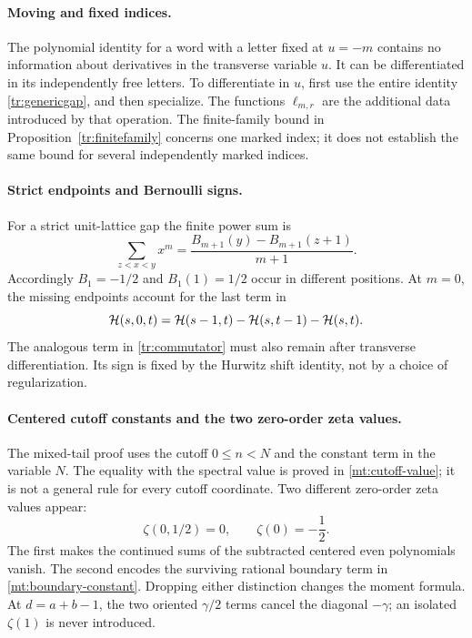 \paragraph{Moving and fixed indices.}
The polynomial identity for a word with a letter fixed at $u=-m$
contains no information about derivatives in the transverse variable
$u$.  It can be differentiated in its independently free letters.
To differentiate in $u$, first use the entire identity
\eqref{tr:genericgap}, and then specialize.  The functions
$\ell_{m,r}$ are the additional data introduced by that operation.
The finite-family bound in Proposition~\ref{tr:finitefamily} concerns
one marked index; it does not establish the same bound for several
independently marked indices.

\paragraph{Strict endpoints and Bernoulli signs.}
For a strict unit-lattice gap the finite power sum is
\[
 \sum_{z<x<y}x^m
   =\frac{B_{m+1}(y)-B_{m+1}(z+1)}{m+1}.
\]
Accordingly $B_1=-1/2$ and $B_1(1)=1/2$ occur in different positions.
At $m=0$, the missing endpoints account for the last term in
\[
 \mathcal H(s,0,t)=\mathcal H(s-1,t)-\mathcal H(s,t-1)-\mathcal H(s,t).
\]
The analogous term in \eqref{tr:commutator} must also remain after
transverse differentiation.  Its sign is fixed by the Hurwitz shift
identity, not by a choice of regularization.

\paragraph{Centered cutoff constants and the two zero-order zeta values.}
The mixed-tail proof uses the cutoff $0\leq n<N$ and the constant
term in the variable $N$.  The equality with the spectral value is
proved in \eqref{mt:cutoff-value}; it is not a general rule for every
cutoff coordinate.  Two different zero-order zeta values appear:
\[
                \zeta(0,1/2)=0,\qquad \zeta(0)=-\frac12.
\]
The first makes the continued sums of the subtracted centered even
polynomials vanish.  The second encodes the surviving rational boundary
term in \eqref{mt:boundary-constant}.  Dropping either distinction
changes the moment formula.  At $d=a+b-1$, the two oriented
$\gamma/2$ terms cancel the diagonal $-\gamma$; an isolated
$\zeta(1)$ is never introduced.

